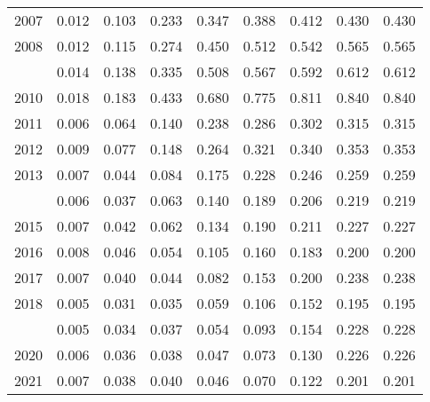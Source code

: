 \documentclass[
]{article}
\begin{document}
\begin{longtable}[t]{lrrrrrrrr}
2007 & 0.012 & 0.103 & 0.233 & 0.347 & 0.388 & 0.412 & 0.430 & 0.430\\
2008 & 0.012 & 0.115 & 0.274 & 0.450 & 0.512 & 0.542 & 0.565 & 0.565\\
\addlinespace
2009 & 0.014 & 0.138 & 0.335 & 0.508 & 0.567 & 0.592 & 0.612 & 0.612\\
2010 & 0.018 & 0.183 & 0.433 & 0.680 & 0.775 & 0.811 & 0.840 & 0.840\\
2011 & 0.006 & 0.064 & 0.140 & 0.238 & 0.286 & 0.302 & 0.315 & 0.315\\
2012 & 0.009 & 0.077 & 0.148 & 0.264 & 0.321 & 0.340 & 0.353 & 0.353\\
2013 & 0.007 & 0.044 & 0.084 & 0.175 & 0.228 & 0.246 & 0.259 & 0.259\\
\addlinespace
2014 & 0.006 & 0.037 & 0.063 & 0.140 & 0.189 & 0.206 & 0.219 & 0.219\\
2015 & 0.007 & 0.042 & 0.062 & 0.134 & 0.190 & 0.211 & 0.227 & 0.227\\
2016 & 0.008 & 0.046 & 0.054 & 0.105 & 0.160 & 0.183 & 0.200 & 0.200\\
2017 & 0.007 & 0.040 & 0.044 & 0.082 & 0.153 & 0.200 & 0.238 & 0.238\\
2018 & 0.005 & 0.031 & 0.035 & 0.059 & 0.106 & 0.152 & 0.195 & 0.195\\
\addlinespace
2019 & 0.005 & 0.034 & 0.037 & 0.054 & 0.093 & 0.154 & 0.228 & 0.228\\
2020 & 0.006 & 0.036 & 0.038 & 0.047 & 0.073 & 0.130 & 0.226 & 0.226\\
2021 & 0.007 & 0.038 & 0.040 & 0.046 & 0.070 & 0.122 & 0.201 & 0.201\\*
\end{longtable}
\end{document}
